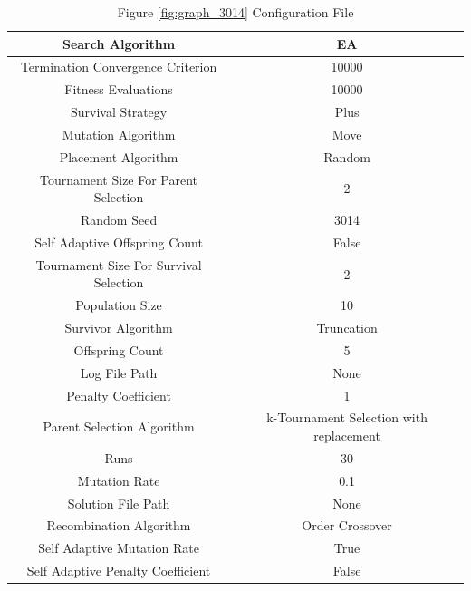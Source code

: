 \documentclass{standalone}
\begin{document}
\begin{table}[!htb]
	\centering
	\caption{Figure \ref{fig:graph_3014} Configuration File}
	\label{tab:graph_3014}
	\begin{tabular}{| c | c |}
		\hline
		Search Algorithm		& EA		 \\
		\hline
		Termination Convergence Criterion		& 10000		 \\
		\hline
		Fitness Evaluations		& 10000		 \\
		\hline
		Survival Strategy		& Plus		 \\
		\hline
		Mutation Algorithm		& Move		 \\
		\hline
		Placement Algorithm		& Random		 \\
		\hline
		Tournament Size For Parent Selection		& 2		 \\
		\hline
		Random Seed		& 3014		 \\
		\hline
		Self Adaptive Offspring Count		& False		 \\
		\hline
		Tournament Size For Survival Selection		& 2		 \\
		\hline
		Population Size		& 10		 \\
		\hline
		Survivor Algorithm		& Truncation		 \\
		\hline
		Offspring Count		& 5		 \\
		\hline
		Log File Path		& None		 \\
		\hline
		Penalty Coefficient		& 1		 \\
		\hline
		Parent Selection Algorithm		& k-Tournament Selection with replacement		 \\
		\hline
		Runs		& 30		 \\
		\hline
		Mutation Rate		& 0.1		 \\
		\hline
		Solution File Path		& None		 \\
		\hline
		Recombination Algorithm		& Order Crossover		 \\
		\hline
		Self Adaptive Mutation Rate		& True		 \\
		\hline
		Self Adaptive Penalty Coefficient		& False		 \\
		\hline
	\end{tabular}
\end{table}
\end{document}

